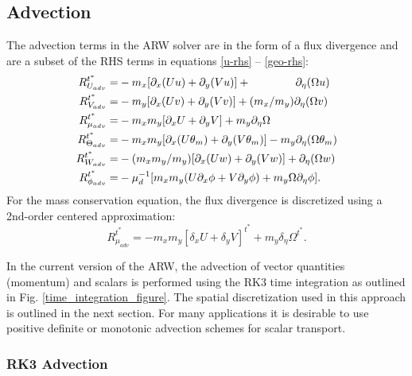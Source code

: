 \subsection{Advection}
\label{advection}

The advection terms in the ARW solver are in the form of a flux divergence and
are a subset of the RHS terms in equations \eqref{u-rhs} --
\eqref{geo-rhs}:
%
\begin{align}
R_{U_{adv}}^{t^*} = &
- m_x[\partial_x(Uu) + \partial_y(Vu)] + \hphantom{(m_x/m_y)} \partial_\eta (\Omega u)
\\
%
R_{V_{adv}}^{t^*} = &
- m_y[\partial_x (Uv) + \partial_y (Vv)] + (m_x/m_y) \partial_\eta (\Omega v)
\\ 
%
R_{\mu_{adv}}^{t^*} = &
- m_x m_y[\partial_x U + \partial_y V] + m_y \partial_\eta\Omega
\\
R_{\Theta_{adv}}^{t^*} = &
- m_x m_y [\partial_x (U\theta_m) + \partial_y (V\theta_m)] - m_y \partial_\eta
(\Omega \theta_m) 
\\
%
R_{W_{adv}}^{t^*} = &
- (m_x m_y/m_y) [\partial_x (Uw) + \partial_y (Vw)] + \partial_\eta
(\Omega w) 
\\
%
R_{\phi_{adv}}^{t^*} = &
- \mu_d^{-1}
[m_x m_y (U\partial_x \phi + V\partial_y \phi) + m_y
\Omega\partial_\eta\phi].
\end{align}
%
\noindent
For the mass conservation equation, the flux divergence is discretized
using a 2nd-order centered approximation:
%
\begin{equation}
R_{\mu_{adv}}^{t^*} = 
- m_x m_y [\delta_x U + \delta_y V]^{t^*} + m_y \delta_\eta \Omega^{t^*}.
\end{equation}
%

In the current version of the ARW, the advection of vector quantities
(momentum) and scalars is performed
using the RK3 time integration as outlined in Fig. 
\ref{time_integration_figure}.  The spatial discretization used in this
approach is outlined in the next section.  For many applications it
is desirable to use positive definite or monotonic advection schemes
for scalar transport.  


\subsubsection{RK3 Advection}
\label{rk3-advection}


